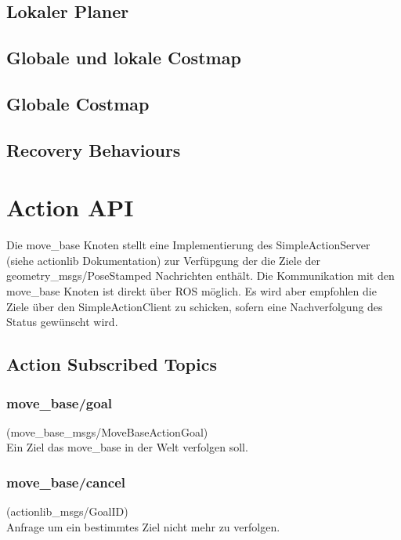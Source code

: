 \documentclass[oribibl]{llncs}
\begin{document}
\subsection{Lokaler Planer}
\subsection{Globale und lokale Costmap}
\subsection{Globale Costmap}
\subsection{Recovery Behaviours}
\section{Action API}
Die move\_base Knoten stellt eine Implementierung des SimpleActionServer (siehe actionlib Dokumentation) zur Verfüpgung der die Ziele der geometry\_msgs/PoseStamped Nachrichten enthält. Die Kommunikation mit den move\_base Knoten ist direkt über ROS möglich. Es wird aber empfohlen die Ziele über den SimpleActionClient zu schicken, sofern eine Nachverfolgung des Status gewünscht wird.
\subsection{Action Subscribed Topics}
\subsubsection{move\_base/goal} (move\_base\_msgs/MoveBaseActionGoal)\\
	Ein Ziel das move\_base in der Welt verfolgen soll.
\subsubsection{move\_base/cancel} (actionlib\_msgs/GoalID)\\
	Anfrage um ein bestimmtes Ziel nicht mehr zu verfolgen.
\end{document}
